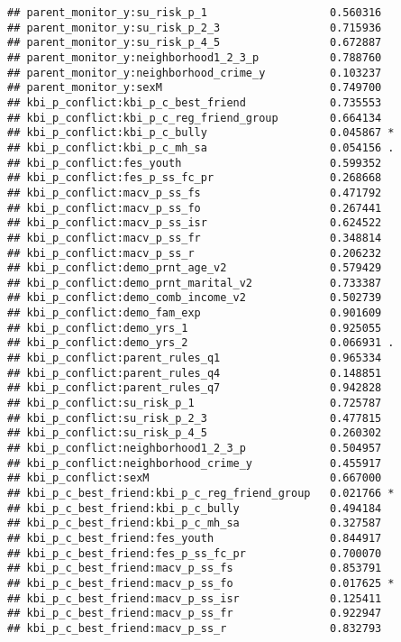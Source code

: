 \documentclass[
]{article}
\begin{document}
\begin{verbatim}
## parent_monitor_y:su_risk_p_1                   0.560316    
## parent_monitor_y:su_risk_p_2_3                 0.715936    
## parent_monitor_y:su_risk_p_4_5                 0.672887    
## parent_monitor_y:neighborhood1_2_3_p           0.788760    
## parent_monitor_y:neighborhood_crime_y          0.103237    
## parent_monitor_y:sexM                          0.749700    
## kbi_p_conflict:kbi_p_c_best_friend             0.735553    
## kbi_p_conflict:kbi_p_c_reg_friend_group        0.664134    
## kbi_p_conflict:kbi_p_c_bully                   0.045867 *  
## kbi_p_conflict:kbi_p_c_mh_sa                   0.054156 .  
## kbi_p_conflict:fes_youth                       0.599352    
## kbi_p_conflict:fes_p_ss_fc_pr                  0.268668    
## kbi_p_conflict:macv_p_ss_fs                    0.471792    
## kbi_p_conflict:macv_p_ss_fo                    0.267441    
## kbi_p_conflict:macv_p_ss_isr                   0.624522    
## kbi_p_conflict:macv_p_ss_fr                    0.348814    
## kbi_p_conflict:macv_p_ss_r                     0.206232    
## kbi_p_conflict:demo_prnt_age_v2                0.579429    
## kbi_p_conflict:demo_prnt_marital_v2            0.733387    
## kbi_p_conflict:demo_comb_income_v2             0.502739    
## kbi_p_conflict:demo_fam_exp                    0.901609    
## kbi_p_conflict:demo_yrs_1                      0.925055    
## kbi_p_conflict:demo_yrs_2                      0.066931 .  
## kbi_p_conflict:parent_rules_q1                 0.965334    
## kbi_p_conflict:parent_rules_q4                 0.148851    
## kbi_p_conflict:parent_rules_q7                 0.942828    
## kbi_p_conflict:su_risk_p_1                     0.725787    
## kbi_p_conflict:su_risk_p_2_3                   0.477815    
## kbi_p_conflict:su_risk_p_4_5                   0.260302    
## kbi_p_conflict:neighborhood1_2_3_p             0.504957    
## kbi_p_conflict:neighborhood_crime_y            0.455917    
## kbi_p_conflict:sexM                            0.667000    
## kbi_p_c_best_friend:kbi_p_c_reg_friend_group   0.021766 *  
## kbi_p_c_best_friend:kbi_p_c_bully              0.494184    
## kbi_p_c_best_friend:kbi_p_c_mh_sa              0.327587    
## kbi_p_c_best_friend:fes_youth                  0.844917    
## kbi_p_c_best_friend:fes_p_ss_fc_pr             0.700070    
## kbi_p_c_best_friend:macv_p_ss_fs               0.853791    
## kbi_p_c_best_friend:macv_p_ss_fo               0.017625 *  
## kbi_p_c_best_friend:macv_p_ss_isr              0.125411    
## kbi_p_c_best_friend:macv_p_ss_fr               0.922947    
## kbi_p_c_best_friend:macv_p_ss_r                0.832793    

\end{verbatim}
\end{document}
